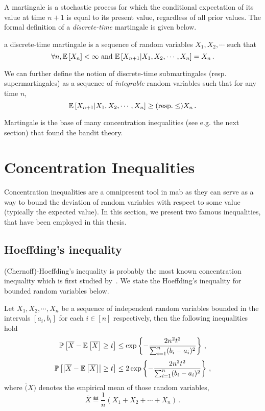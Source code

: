 A martingale is a stochastic process for which the conditional expectation of its value at time $n+1$ is equal to its present value, regardless of all prior values. The formal definition of a \emph{discrete-time} martingale is given below.

\begin{definition}\label{def:maths.martingale}
\begin{leftbar}[defnbar]
    a discrete-time martingale is a sequence of random variables $X_1, X_2, \cdots$ such that
    \[
        \forall n, \mathbb{E}\left[X_n\right] < \infty \text{ and } \mathbb{E}\left[X_{n+1}|X_1,X_2,\cdots,X_n\right] = X_n\,.
    \]
\end{leftbar}
\end{definition}

We can further define the notion of discrete-time submartingales (resp. supermartingales) as a sequence of \emph{integrable} random variables such that for any time $n$,
\[
    \mathbb{E}\left[X_{n+1}|X_1,X_2,\cdots,X_n\right] \geq (\text{resp.} \leq) X_n\,.
\]

Martingale is the base of many concentration inequalities (see e.g. the next section) that found the bandit theory. 

\section{Concentration Inequalities}\label{app:maths.concentration}

Concentration inequalities are a omnipresent tool in \gls{mab} as they can serve as a way to bound the deviation of random variables with respect to some value (typically the expected value). In this section, we present two famous inequalities, that have been employed in this thesis.

\subsection{Hoeffding's inequality}

(Chernoff)-Hoeffding's inequality is probably the most known concentration inequality which is first studied by~\cite{hoeffding1963}. We state the Hoeffding's inequality for bounded random variables below.

\begin{theorem}\label{thm:maths.hoeffding}
\begin{leftbar}[theorembar]
    Let $X_1, X_2, \cdots, X_n$ be a sequence of independent random variables bounded in the intervals $[a_i,b_i]$ for each $i\in[n]$ respectively, then the following inequalities hold
    \[
        \mathbb{P}\left[\overline{X}-\mathbb{E}\left[\overline{X}\right] \geq t\right] \leq \exp\left\{-\frac{2n^2t^2}{\sum_{i=1}^n(b_i-a_i)^2}\right\}\,,
    \]
    \[
        \mathbb{P}\left[\left|\overline{X}-\mathbb{E}\left[\overline{X}\right]\right| \geq t\right] \leq 2\exp\left\{-\frac{2n^2t^2}{\sum_{i=1}^n(b_i-a_i)^2}\right\}\,,
    \]
    where $\bar(X)$ denotes the empirical mean of those random variables,
    \[
        \bar{X} \eqdef \frac{1}{n}(X_1+X_2+\cdots+X_n)\,.
    \]
\end{leftbar}
\end{theorem}

